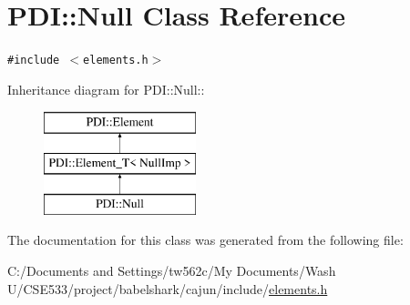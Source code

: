 \hypertarget{class_p_d_i_1_1_null}{
\section{PDI::Null Class Reference}
\label{class_p_d_i_1_1_null}
}
{\tt \#include $<$elements.h$>$}

Inheritance diagram for PDI::Null::\begin{figure}[H]
\begin{center}
\leavevmode
\includegraphics[height=3cm]{class_p_d_i_1_1_null}
\end{center}
\end{figure}


The documentation for this class was generated from the following file:\begin{CompactItemize}
\item 
C:/Documents and Settings/tw562c/My Documents/Wash U/CSE533/project/babelshark/cajun/include/\hyperlink{elements_8h}{elements.h}\end{CompactItemize}
